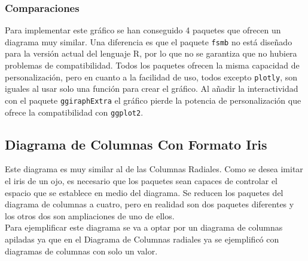 \documentclass{article}\usepackage[]{graphicx}\usepackage[]{color}
\begin{document}
\subsubsection{Comparaciones}
Para implementar este gr\'afico se han conseguido 4 paquetes que ofrecen un diagrama muy similar. Una diferencia es que el paquete \texttt{fsmb} no est\'a dise\~nado para la versi\'on actual del lenguaje R, por lo que no se garantiza que no hubiera problemas de compatibilidad. Todos los paquetes ofrecen la misma capacidad de personalizaci\'on, pero en cuanto a la facilidad de uso, todos excepto \texttt{plotly}, son iguales al usar solo una funci\'on para crear el gr\'afico. Al a\~nadir la interactividad con el paquete \texttt{ggiraphExtra} el gr\'afico pierde la potencia de personalizaci\'on que ofrece la compatibilidad con \texttt{ggplot2}.
\clearpage
\subsection{Diagrama de Columnas Con Formato Iris}\label{ssec:columnasformatoiris}
Este diagrama es muy similar al de las Columnas Radiales. Como se desea imitar el iris de un ojo, es necesario que los paquetes sean capaces de controlar el espacio que se establece en medio del diagrama. Se reducen los paquetes del diagrama de columnas a cuatro, pero en realidad son dos paquetes diferentes y los otros dos son ampliaciones de uno de ellos.~\\
Para ejemplificar este diagrama se va a optar por un diagrama de columnas apiladas ya que en el Diagrama de Columnas radiales ya se ejemplific\'o con diagramas de columnas con solo un valor.
\end{document}
